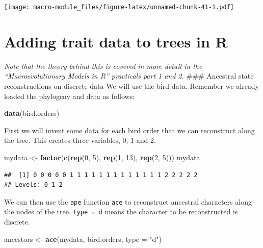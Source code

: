 \documentclass[]{book}
\newenvironment{Shaded}{\begin{snugshade}}{\end{snugshade}}
\newcommand{\KeywordTok}[1]{\textcolor[rgb]{0.13,0.29,0.53}{\textbf{{#1}}}}
\newcommand{\DataTypeTok}[1]{\textcolor[rgb]{0.13,0.29,0.53}{{#1}}}
\newcommand{\DecValTok}[1]{\textcolor[rgb]{0.00,0.00,0.81}{{#1}}}
\newcommand{\StringTok}[1]{\textcolor[rgb]{0.31,0.60,0.02}{{#1}}}
\newcommand{\NormalTok}[1]{{#1}}
\begin{document}
\texttt{[image: macro-module\_files/figure-latex/unnamed-chunk-41-1.pdf]}

\section{Adding trait data to trees in
R}\label{adding-trait-data-to-trees-in-r}

\emph{Note that the theory behind this is covered in more detail in the
``Macroevolutionary Models in R'' practicals part 1 and 2.} \#\#\#
Ancestral state reconstructions on discrete data We will use the bird
data. Remember we already loaded the phylogeny and data as follows:

\begin{Shaded}
\begin{Highlighting}[]
\KeywordTok{data}\NormalTok{(bird.orders)}
\end{Highlighting}
\end{Shaded}

First we will invent some data for each bird order that we can
reconstruct along the tree. This creates three variables, 0, 1 and 2.

\begin{Shaded}
\begin{Highlighting}[]
\NormalTok{mydata <-}\StringTok{ }\KeywordTok{factor}\NormalTok{(}\KeywordTok{c}\NormalTok{(}\KeywordTok{rep}\NormalTok{(}\DecValTok{0}\NormalTok{, }\DecValTok{5}\NormalTok{), }\KeywordTok{rep}\NormalTok{(}\DecValTok{1}\NormalTok{, }\DecValTok{13}\NormalTok{), }\KeywordTok{rep}\NormalTok{(}\DecValTok{2}\NormalTok{, }\DecValTok{5}\NormalTok{)))}
\NormalTok{mydata}
\end{Highlighting}
\end{Shaded}

\begin{verbatim}
##  [1] 0 0 0 0 0 1 1 1 1 1 1 1 1 1 1 1 1 1 2 2 2 2 2
## Levels: 0 1 2
\end{verbatim}

We can then use the \texttt{ape} function \texttt{ace} to reconstruct
ancestral characters along the nodes of the tree. \texttt{type\ =\ d}
means the character to be reconstructed is discrete.

\begin{Shaded}
\begin{Highlighting}[]
\NormalTok{ancestors <-}\StringTok{ }\KeywordTok{ace}\NormalTok{(mydata, bird.orders, }\DataTypeTok{type =} \StringTok{"d"}\NormalTok{)}
\end{Highlighting}
\end{Shaded}
\end{document}
